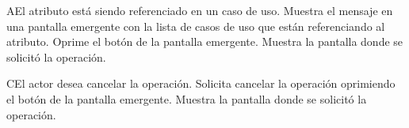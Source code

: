  \begin{UCtrayectoriaA}{A}{El atributo está siendo referenciado en un caso de uso.}
    \UCpaso[\UCsist] Muestra el mensaje  en una pantalla emergente
    con la lista de casos de uso que están referenciando al atributo.
    \UCpaso[\UCactor] Oprime el botón  de la pantalla emergente.
    \UCpaso[\UCsist] Muestra la pantalla donde se solicitó la operación.
 \end{UCtrayectoriaA}
 \begin{UCtrayectoriaA}{C}{El actor desea cancelar la operación.}
    \UCpaso[\UCactor] Solicita cancelar la operación oprimiendo el botón  de la pantalla emergente.
    \UCpaso[\UCsist] Muestra la pantalla donde se solicitó la operación.
 \end{UCtrayectoriaA} 